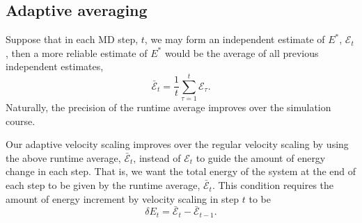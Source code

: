 \documentclass[reprint]{revtex4-1}
\begin{document}
\subsection{Adaptive averaging}



Suppose that in each MD step, $t$,
we may form an independent estimate of $E^*$,
$\mathcal E_t$,
then a more reliable estimate of $E^*$
would be the average of
all previous independent estimates,
%
\begin{equation}
  \bar{\mathcal E}_t
  =
  \frac 1 t
  \sum_{\tau = 1}^t
    \mathcal E_\tau
  .
  \label{eq:Epsave}
\end{equation}
%
Naturally, the precision of the runtime average
improves over the simulation course.



Our adaptive velocity scaling
improves over the regular velocity scaling
by using the above runtime average,
$\bar{\mathcal E}_t$,
instead of $\mathcal E_t$
to guide the amount of energy change in each step.
%
That is, we want
the total energy of the system
at the end of each step
to be given by
the runtime average, $\bar{\mathcal E}_t$.
%
This condition requires the amount of energy increment
by velocity scaling in step $t$ to be
%
\begin{equation}
  \delta E_t
  =
  \bar{\mathcal E}_t - \bar{\mathcal E}_{t - 1}
  .
  \label{eq:dE_adaptive}
\end{equation}
\end{document}
